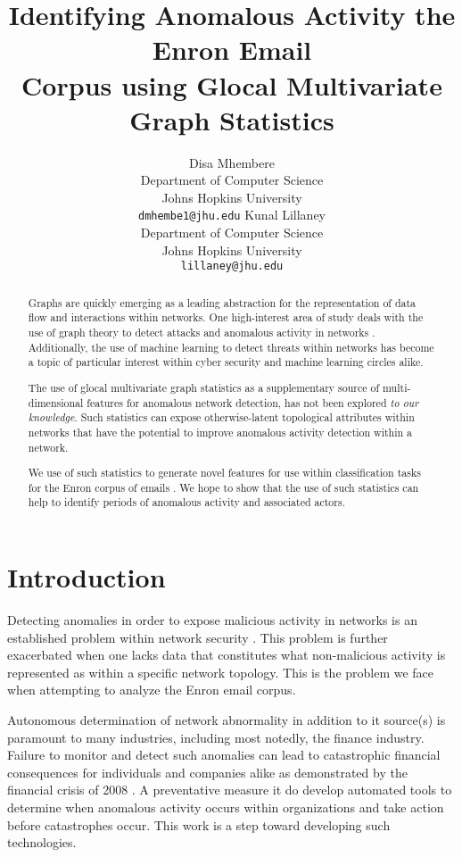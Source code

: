 \documentclass[11pt,letterpaper]{article}
\title{Identifying Anomalous Activity the Enron Email \\
				Corpus using Glocal Multivariate Graph Statistics}
\author{Disa Mhembere\\
  Department of Computer Science\\
  Johns Hopkins University\\
  {\tt dmhembe1@jhu.edu}
  \And
  Kunal Lillaney \\
  Department of Computer Science\\
  Johns Hopkins University\\
  {\tt lillaney@jhu.edu}}
\date{}
\begin{document}
\maketitle
\begin{abstract}
Graphs are quickly emerging as a leading abstraction for the representation of data
flow and interactions within networks. One high-interest area of study deals with 
the use of graph theory to detect attacks and anomalous activity in networks 
\cite{priebe2005scan,park2009anomaly,park2013anomaly}.
Additionally, the use of machine learning to detect threats within networks 
has become a topic of particular interest 
\cite{mahoney2003machine,shon2005machine,sommer2010outside,shon2007hybrid} within
cyber security and machine learning circles alike.

The use of glocal multivariate graph statistics \cite{mhembere2013computing} as 
a supplementary source of multi-dimensional features for anomalous network detection,
has not been explored \textit{to our knowledge}. Such statistics can expose 
otherwise-latent topological attributes within networks that have the potential 
to improve anomalous activity detection within a network.

We use of such statistics to generate novel features for use within
classification tasks for the Enron corpus of emails \cite{enronrepo2009}.
We hope to show that the use of such statistics can help to identify periods of
anomalous activity and associated actors.
\end{abstract}


\section{Introduction}
Detecting anomalies in order to expose malicious activity in networks is an
established problem within network security \cite{roesch1999snort,zhang2000intrusion}.
This problem is further exacerbated when one lacks data that constitutes what non-malicious
activity is represented as within a specific network topology. This is the problem
we face when attempting to analyze the Enron email corpus. 

Autonomous determination of network abnormality in addition to it source(s) is paramount
to many industries, including most notedly, the finance industry.
Failure to monitor and detect such anomalies can lead to catastrophic financial
consequences for individuals and companies alike as demonstrated by the financial 
crisis of 2008 \cite{grigor2009financial}. A preventative measure it do develop automated tools
to determine when anomalous activity occurs within organizations and take action before
catastrophes occur. This work is a step toward developing such technologies.
\end{document}
